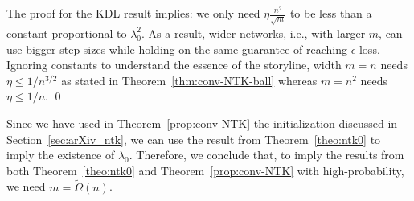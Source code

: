 \begin{remark}
The proof for the KDL result implies: we only need $\eta \frac{n^2}{\sqrt{m}}$ to be less than a constant proportional to $\lambda_0^2$. As a result, wider networks, i.e., with larger $m$, can use bigger step sizes while holding on the same guarantee of reaching $\epsilon$ loss. 
Ignoring constants to understand the essence of the storyline,  width $m = n$ needs $\eta \leq 1/n^{3/2}$ as stated in Theorem~\ref{thm:conv-NTK-ball} whereas $m=n^2$ needs $\eta \leq 1/n$. \qed 
\end{remark}

\begin{remark}
Since we have used in Theorem~\ref{prop:conv-NTK} the initialization discussed in Section~\ref{sec:arXiv_ntk}, we can use the result from Theorem~\ref{theo:ntk0} to imply the existence of $\lambda_0$. 
Therefore, we conclude that, to imply the results from both Theorem~\ref{theo:ntk0} and Theorem~\ref{prop:conv-NTK} with high-probability, we need $m=\tilde{\Omega}(n)$.
\end{remark}
